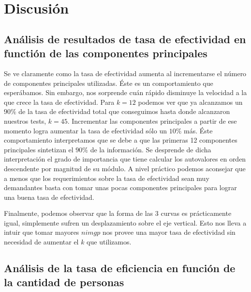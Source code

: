 \section{Discusión}

\subsection{Análisis de resultados de tasa de efectividad en functión de las componentes principales}
Se ve claramente como la tasa de efectividad aumenta al incrementarse el número de componentes principales utilizadas. Éste es un comportamiento
que esperábamos. Sin embargo, nos sorprende cuán rápido disminuye la velocidad a la que crece la tasa de efectividad. Para $k = 12$ podemos ver
que ya alcanzamos un $90\%$ de la tasa de efectividad total que conseguimos hasta donde alcanzaron nuestros tests, $k = 45$. Incrementar las 
componentes principales a partir de ese momento logra aumentar la tasa de efectividad sólo un $10\%$ más. Éste comportamiento interpretamos
que se debe a que las primeras 12 componentes principales sintetizan el $90\%$ de la información. Se desprende de dicha interpretación
el grado de importancia que tiene calcular los autovalores en orden descendente por magnitud de su módulo. A nivel práctico podemos aconsejar
que a menos que los requerimientos sobre la tasa de efectividad sean muy demandantes basta con tomar unas pocas componentes principales
para lograr una buena tasa de efectividad.
\par
Finalmente, podemos observar que la forma de las 3 curvas es prácticamente igual, simplemente sufren un desplazamiento sobre el eje
vertical. Esto nos lleva a intuir que tomar mayores $nimgp$ nos provee una mayor tasa de efectividad sin necesidad de aumentar el $k$ que
utilizamos.

\subsection{Análisis de la tasa de eficiencia en función de la cantidad de personas}


